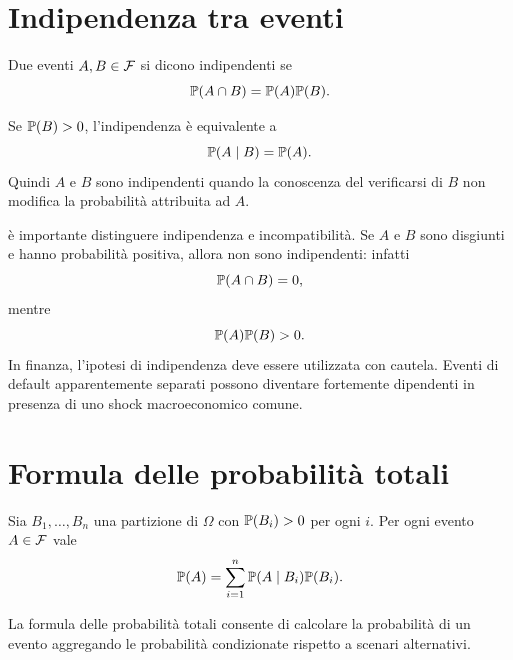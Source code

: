 \section{Indipendenza tra eventi}

\begin{definition}
Due eventi $A,B\in\mathcal{F}$ si dicono indipendenti se
\[
\mathbb{P}(A\cap B)=\mathbb{P}(A)\mathbb{P}(B).
\]

\end{definition}

Se $\mathbb{P}(B)>0$, l'indipendenza \`{e} equivalente a
\[
\mathbb{P}(A\mid B)=\mathbb{P}(A).
\]
Quindi $A$ e $B$ sono indipendenti quando la conoscenza del verificarsi di $B$
non modifica la probabilit\`{a} attribuita ad $A$.

\`{e} importante distinguere indipendenza e incompatibilit\`{a}. Se $A$ e $B$
sono disgiunti e hanno probabilit\`{a} positiva, allora non sono indipendenti:
infatti
\[
\mathbb{P}(A\cap B)=0,
\]
mentre
\[
\mathbb{P}(A)\mathbb{P}(B)>0.
\]
In finanza, l'ipotesi di indipendenza deve essere utilizzata con cautela.
Eventi di default apparentemente separati possono diventare fortemente
dipendenti in presenza di uno shock macroeconomico comune.

\section{Formula delle probabilit\`{a} totali}

Sia $B_{1},\ldots,B_{n}$ una partizione di $\Omega$ con $\mathbb{P}(B_{i})>0$
per ogni $i$. Per ogni evento $A\in\mathcal{F}$ vale
\[
\mathbb{P}(A)=\sum_{i=1}^{n}\mathbb{P}(A\mid B_{i})\mathbb{P}(B_{i}).
\]


La formula delle probabilit\`{a} totali consente di calcolare la
probabilit\`{a} di un evento aggregando le probabilit\`{a} condizionate
rispetto a scenari alternativi.

